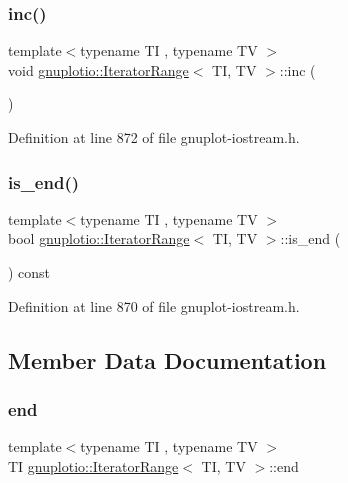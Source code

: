 \subsubsection{\texorpdfstring{inc()}{inc()}}
{\footnotesize\ttfamily template$<$typename TI , typename TV $>$ \\
void \hyperlink{classgnuplotio_1_1_iterator_range}{gnuplotio\+::\+Iterator\+Range}$<$ TI, TV $>$\+::inc (\begin{DoxyParamCaption}{ }\end{DoxyParamCaption})\hspace{0.3cm}{\ttfamily [inline]}}



Definition at line 872 of file gnuplot-\/iostream.\+h.

\mbox{\label{classgnuplotio_1_1_iterator_range_a966a08441bdd5f5e76e37ef06f507ad7}} 
\subsubsection{\texorpdfstring{is\+\_\+end()}{is\_end()}}
{\footnotesize\ttfamily template$<$typename TI , typename TV $>$ \\
bool \hyperlink{classgnuplotio_1_1_iterator_range}{gnuplotio\+::\+Iterator\+Range}$<$ TI, TV $>$\+::is\+\_\+end (\begin{DoxyParamCaption}{ }\end{DoxyParamCaption}) const\hspace{0.3cm}{\ttfamily [inline]}}



Definition at line 870 of file gnuplot-\/iostream.\+h.



\subsection{Member Data Documentation}
\mbox{\label{classgnuplotio_1_1_iterator_range_a495da9f5b28eafb67a8398ceb90638fb}} 
\subsubsection{\texorpdfstring{end}{end}}
{\footnotesize\ttfamily template$<$typename TI , typename TV $>$ \\
TI \hyperlink{classgnuplotio_1_1_iterator_range}{gnuplotio\+::\+Iterator\+Range}$<$ TI, TV $>$\+::end\hspace{0.3cm}{\ttfamily [private]}}



